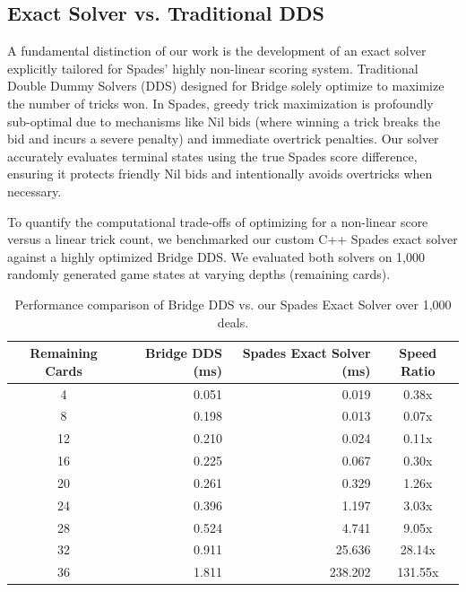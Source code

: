 \documentclass{article}
\begin{document}
\subsection{Exact Solver vs. Traditional DDS}

A fundamental distinction of our work is the development of an exact solver explicitly tailored for Spades' highly non-linear scoring system. Traditional Double Dummy Solvers (DDS) designed for Bridge solely optimize to maximize the number of tricks won. In Spades, greedy trick maximization is profoundly sub-optimal due to mechanisms like Nil bids (where winning a trick breaks the bid and incurs a severe penalty) and immediate overtrick penalties. Our solver accurately evaluates terminal states using the true Spades score difference, ensuring it protects friendly Nil bids and intentionally avoids overtricks when necessary.

To quantify the computational trade-offs of optimizing for a non-linear score versus a linear trick count, we benchmarked our custom C++ Spades exact solver against a highly optimized Bridge DDS. We evaluated both solvers on 1,000 randomly generated game states at varying depths (remaining cards).

\begin{table}[!htbp]
  \caption{Performance comparison of Bridge DDS vs. our Spades Exact Solver over 1,000 deals.}
  \label{table:solver-comparison}
  \centering
  \begin{tabular}{crrc}
    \toprule
    Remaining Cards & Bridge DDS (ms) & Spades Exact Solver (ms) & Speed Ratio \\
    \midrule
    4 & 0.051 & 0.019 & 0.38x \\
    8 & 0.198 & 0.013 & 0.07x \\
    12 & 0.210 & 0.024 & 0.11x \\
    16 & 0.225 & 0.067 & 0.30x \\
    20 & 0.261 & 0.329 & 1.26x \\
    24 & 0.396 & 1.197 & 3.03x \\
    28 & 0.524 & 4.741 & 9.05x \\
    32 & 0.911 & 25.636 & 28.14x \\
    36 & 1.811 & 238.202 & 131.55x \\
    \bottomrule
  \end{tabular}
\end{table}
\end{document}
